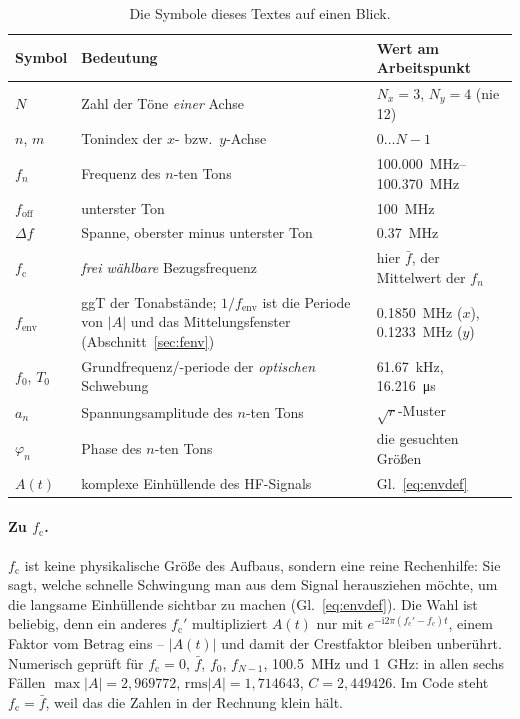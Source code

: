 \documentclass[11pt,a4paper]{article}
\newcommand{\crest}{\ensuremath{C}}
\begin{document}
\begin{table}[htb]
  \centering
  \caption{Die Symbole dieses Textes auf einen Blick.}
  \label{tab:symbols}
  \begin{tabular}{@{}p{}p{}p{}@{}}
    \toprule
    Symbol & Bedeutung & Wert am Arbeitspunkt\\
    \midrule
    $N$ & Zahl der Töne \emph{einer} Achse & $N_x=3$, $N_y=4$ (nie 12)\\
    $n$, $m$ & Tonindex der $x$- bzw.\ $y$-Achse & $0\dots N-1$\\
    $f_n$ & Frequenz des $n$-ten Tons & \SIrange{100.000}{100.370}{\mega\hertz}\\
    $f_\mathrm{off}$ & unterster Ton & \SI{100}{\mega\hertz}\\
    $\Delta f$ & Spanne, oberster minus unterster Ton & \SI{0.37}{\mega\hertz}\\
    $f_\mathrm{c}$ & \emph{frei wählbare} Bezugsfrequenz &
      hier $\bar f$, der Mittelwert der $f_n$\\
    $f_\mathrm{env}$ & ggT der Tonabstände; $1/f_\mathrm{env}$ ist die Periode von $|A|$ und das Mittelungsfenster (Abschnitt~\ref{sec:fenv}) &
      \SI{0.1850}{\mega\hertz} ($x$), \SI{0.1233}{\mega\hertz} ($y$)\\
    $f_0$, $T_0$ & Grundfrequenz/-periode der \emph{optischen} Schwebung &
      \SI{61.67}{\kilo\hertz}, \SI{16.216}{\micro\second}\\
    $a_n$ & Spannungsamplitude des $n$-ten Tons & $\sqrt{r}$-Muster\\
    $\varphi_n$ & Phase des $n$-ten Tons & die gesuchten Größen\\
    $A(t)$ & komplexe Einhüllende des HF-Signals & Gl.~\eqref{eq:envdef}\\
    \bottomrule
  \end{tabular}
\end{table}

\paragraph{Zu \boldmath$f_\mathrm{c}$.}
$f_\mathrm{c}$ ist keine physikalische Größe des Aufbaus, sondern eine reine
Rechenhilfe: Sie sagt, welche schnelle Schwingung man aus dem Signal
herausziehen möchte, um die langsame Einhüllende sichtbar zu machen
(Gl.~\eqref{eq:envdef}). Die Wahl ist beliebig, denn ein anderes
$f_\mathrm{c}'$ multipliziert $A(t)$ nur mit
$e^{-\mathrm{i}2\pi(f_\mathrm{c}'-f_\mathrm{c})t}$, einem Faktor vom Betrag
eins -- $|A(t)|$ und damit der Crestfaktor bleiben unberührt. Numerisch
geprüft für $f_\mathrm{c} = 0$, $\bar f$, $f_0$, $f_{N-1}$,
\SI{100.5}{\mega\hertz} und \SI{1}{\giga\hertz}: in allen sechs Fällen
$\max|A| = 2{,}969772$, $\mathrm{rms}|A| = 1{,}714643$,
$\crest = 2{,}449426$. Im Code steht $f_\mathrm{c} = \bar f$, weil das die
Zahlen in der Rechnung klein hält.
\end{document}
